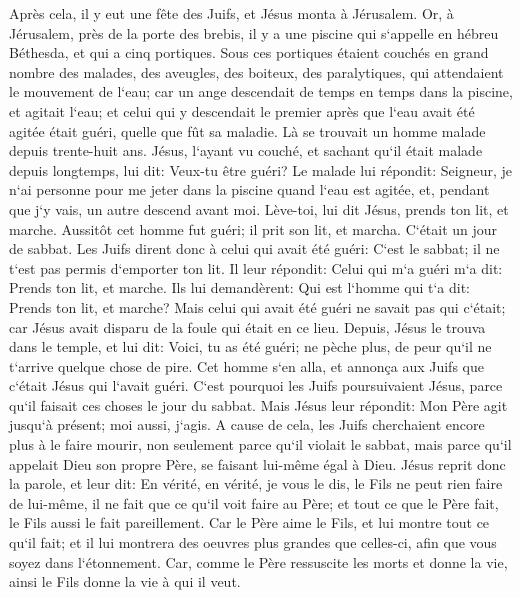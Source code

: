 \verse Après cela, il y eut une fête des Juifs, et Jésus monta à Jérusalem. 
\verse Or, à Jérusalem, près de la porte des brebis, il y a une piscine qui s`appelle en hébreu Béthesda, et qui a cinq portiques. 
\verse Sous ces portiques étaient couchés en grand nombre des malades, des aveugles, des boiteux, des paralytiques, qui attendaient le mouvement de l`eau; 
\verse car un ange descendait de temps en temps dans la piscine, et agitait l`eau; et celui qui y descendait le premier après que l`eau avait été agitée était guéri, quelle que fût sa maladie. 
\verse Là se trouvait un homme malade depuis trente-huit ans. 
\verse Jésus, l`ayant vu couché, et sachant qu`il était malade depuis longtemps, lui dit: Veux-tu être guéri? 
\verse Le malade lui répondit: Seigneur, je n`ai personne pour me jeter dans la piscine quand l`eau est agitée, et, pendant que j`y vais, un autre descend avant moi. 
\verse Lève-toi, lui dit Jésus, prends ton lit, et marche. 
\verse Aussitôt cet homme fut guéri; il prit son lit, et marcha. 
\verse C`était un jour de sabbat. Les Juifs dirent donc à celui qui avait été guéri: C`est le sabbat; il ne t`est pas permis d`emporter ton lit. 
\verse Il leur répondit: Celui qui m`a guéri m`a dit: Prends ton lit, et marche. 
\verse Ils lui demandèrent: Qui est l`homme qui t`a dit: Prends ton lit, et marche? 
\verse Mais celui qui avait été guéri ne savait pas qui c`était; car Jésus avait disparu de la foule qui était en ce lieu. 
\verse Depuis, Jésus le trouva dans le temple, et lui dit: Voici, tu as été guéri; ne pèche plus, de peur qu`il ne t`arrive quelque chose de pire. 
\verse Cet homme s`en alla, et annonça aux Juifs que c`était Jésus qui l`avait guéri. 
\verse C`est pourquoi les Juifs poursuivaient Jésus, parce qu`il faisait ces choses le jour du sabbat. 
\verse Mais Jésus leur répondit: Mon Père agit jusqu`à présent; moi aussi, j`agis. 
\verse A cause de cela, les Juifs cherchaient encore plus à le faire mourir, non seulement parce qu`il violait le sabbat, mais parce qu`il appelait Dieu son propre Père, se faisant lui-même égal à Dieu. 
\verse Jésus reprit donc la parole, et leur dit: En vérité, en vérité, je vous le dis, le Fils ne peut rien faire de lui-même, il ne fait que ce qu`il voit faire au Père; et tout ce que le Père fait, le Fils aussi le fait pareillement. 
\verse Car le Père aime le Fils, et lui montre tout ce qu`il fait; et il lui montrera des oeuvres plus grandes que celles-ci, afin que vous soyez dans l`étonnement. 
\verse Car, comme le Père ressuscite les morts et donne la vie, ainsi le Fils donne la vie à qui il veut. 
